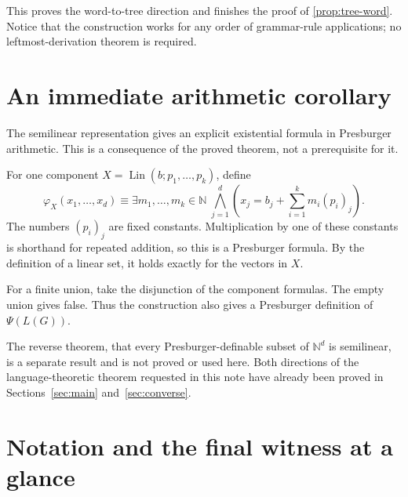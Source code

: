 \documentclass[11pt,a4paper]{article}
\numberwithin{equation}{section}
\theoremstyle{plain}
\theoremstyle{definition}
\theoremstyle{remark}
\newcommand{\N}{\mathbb N}
\newcommand{\Lin}{\operatorname{Lin}}
\begin{document}
This proves the word-to-tree direction and finishes the proof of \cref{prop:tree-word}. Notice that the construction works for any order of grammar-rule applications; no leftmost-derivation theorem is required.

\section{An immediate arithmetic corollary}\label{app:presburger}

The semilinear representation gives an explicit existential formula in Presburger arithmetic. This is a consequence of the proved theorem, not a prerequisite for it.

For one component $X=\Lin(b;p_1,\ldots,p_k)$, define
\[
\varphi_X(x_1,\ldots,x_d)\equiv
\exists m_1,\ldots,m_k\in\N\;
\bigwedge_{j=1}^d
\left(x_j=b_j+\sum_{i=1}^k m_i(p_i)_j\right).
\]
The numbers $(p_i)_j$ are fixed constants. Multiplication by one of these constants is shorthand for repeated addition, so this is a Presburger formula. By the definition of a linear set, it holds exactly for the vectors in $X$.

For a finite union, take the disjunction of the component formulas. The empty union gives false. Thus the construction also gives a Presburger definition of $\Psi(L(G))$.

The reverse theorem, that every Presburger-definable subset of $\N^d$ is semilinear, is a separate result and is not proved or used here. Both directions of the language-theoretic theorem requested in this note have already been proved in Sections~\ref{sec:main} and~\ref{sec:converse}.

\section{Notation and the final witness at a glance}\label{app:notation}
\end{document}
